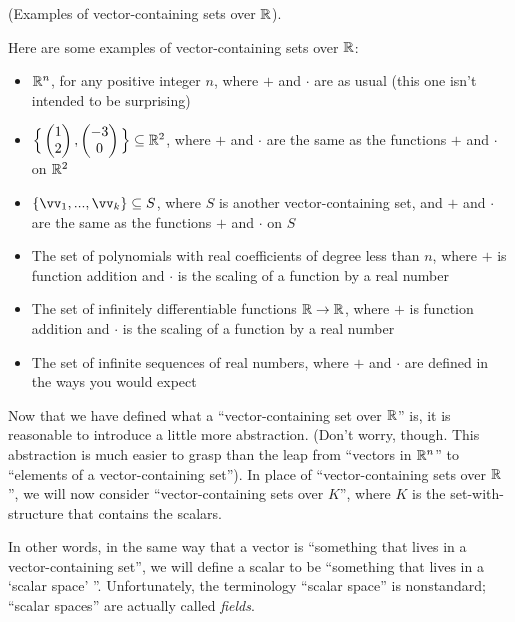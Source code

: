 \begin{remark}
    (Examples of vector-containing sets over $\mathbb{R}$).
    
    Here are some examples of vector-containing sets over $\mathbb{R}$:
    
    \begin{itemize}
        \item $\mathbb{R}^n$, for any positive integer $n$, where $+$ and $\cdot$ are as usual (this one isn't intended to be surprising)
        \item $\Big\{\begin{pmatrix} 1 \\ 2 \end{pmatrix}, \begin{pmatrix} -3 \\ 0 \end{pmatrix}\Big\} \subseteq \mathbb{R}^2$, where $+$ and $\cdot$ are the same as the functions $+$ and $\cdot$ on $\mathbb{R}^2$
        \item $\{\vv_1, ..., \vv_k\} \subseteq S$, where $S$ is another vector-containing set, and $+$ and $\cdot$ are the same as the functions $+$ and $\cdot$ on $S$
        \item The set of polynomials with real coefficients of degree less than $n$, where $+$ is function addition and $\cdot$ is the scaling of a function by a real number
        \item The set of infinitely differentiable functions $\mathbb{R} \rightarrow \mathbb{R}$, where $+$ is function addition and $\cdot$ is the scaling of a function by a real number
        \item The set of infinite sequences of real numbers, where $+$ and $\cdot$ are defined in the ways you would expect
    \end{itemize}
\end{remark}

Now that we have defined what a ``vector-containing set over $\mathbb{R}$'' is, it is reasonable to introduce a little more abstraction. (Don't worry, though. This abstraction is much easier to grasp than the leap from ``vectors in $\mathbb{R}^n$'' to ``elements of a vector-containing set''). In place of ``vector-containing sets over $\mathbb{R}$'', we will now consider ``vector-containing sets over $K$'', where $K$ is the set-with-structure that contains the scalars.

In other words, in the same way that a vector is ``something that lives in a vector-containing set'', we will define a scalar to be ``something that lives in a `scalar space' ''.  Unfortunately, the terminology ``scalar space'' is nonstandard;  ``scalar spaces'' are actually called \textit{fields}.

